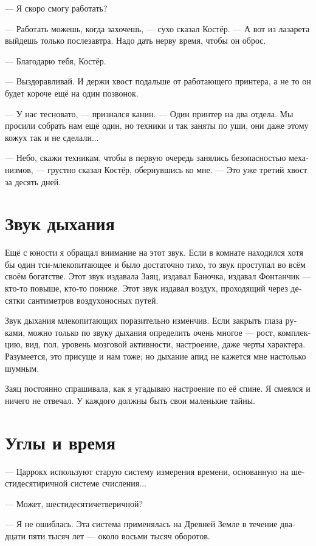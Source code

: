 \documentclass[a4paper,12pt,fleqn]{book}\usepackage{cooltooltips}\usepackage{polyglossia}\setdefaultlanguage[babelshorthands=true]{russian}\setotherlanguage{english}\defaultfontfeatures{Ligatures=TeX,Mapping=tex-text} \usepackage{xcolor}\definecolor{lightgray}{HTML}{bbbbbb}\color{lightgray}\newcommand{\ml}[3]{\textenglish{\textcolor{black}{#3}}}
\begin{document}
{--- Я скоро смогу работать?

--- Работать можешь, когда захочешь, --- сухо сказал Костёр.
--- А вот из лазарета выйдешь только послезавтра.
Надо дать нерву время, чтобы он оброс.

--- Благодарю тебя, Костёр.

--- Выздоравливай.
И держи хвост подальше от работающего принтера, а не то он будет короче ещё на один позвонок.

--- У нас тесновато, --- признался канин.
--- Один принтер на два отдела.
Мы просили собрать нам ещё один, но техники и так заняты по уши, они даже этому кожух так и не сделали...

--- Небо, скажи техникам, чтобы в первую очередь занялись безопасностью механизмов, --- грустно сказал Костёр, обернувшись ко мне.
--- Это уже третий хвост за десять дней.

\section{Звук дыхания}

Ещё с юности я обращал внимание на этот звук.
Если в комнате находился хотя бы один тси-млекопитающее и было достаточно тихо, то звук проступал во всём своём богатстве.
Этот звук издавала Заяц, издавал Баночка, издавал Фонтанчик --- кто-то повыше, кто-то пониже.
Этот звук издавал воздух, проходящий через десятки сантиметров воздухоносных путей.

Звук дыхания млекопитающих поразительно изменчив.
Если закрыть глаза руками, можно только по звуку дыхания определить очень многое --- рост, комплекцию, вид, пол, уровень мозговой активности, настроение, даже черты характера.
Разумеется, это присуще и нам тоже;
но дыхание апид не кажется мне настолько шумным.

Заяц постоянно спрашивала, как я угадываю настроение по её спине.
Я смеялся и ничего не отвечал.
У каждого должны быть свои маленькие тайны.

\section{Углы и время}

--- Царрокх используют старую систему измерения времени, основанную на шестидесятиричной системе счисления...

--- Может, шестидесятичетверичной?

--- Я не ошиблась.
Эта система применялась на Древней Земле в течение двадцати пяти тысяч лет --- около восьми тысяч оборотов.

}
\end{document}

